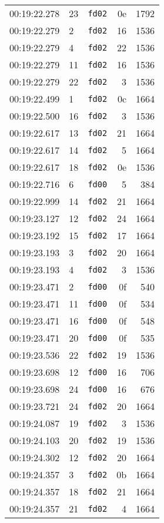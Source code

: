 \documentclass{article}
\begin{document}
\begin{longtable}{lllrr}
00:19:22.278 & 23 & \texttt{fd02} & 0e & 1792 \\
00:19:22.279 & 2 & \texttt{fd02} & 16 & 1536 \\
00:19:22.279 & 4 & \texttt{fd02} & 22 & 1536 \\
00:19:22.279 & 11 & \texttt{fd02} & 16 & 1536 \\
00:19:22.279 & 22 & \texttt{fd02} & 3 & 1536 \\
00:19:22.499 & 1 & \texttt{fd02} & 0c & 1664 \\
00:19:22.500 & 16 & \texttt{fd02} & 3 & 1536 \\
00:19:22.617 & 13 & \texttt{fd02} & 21 & 1664 \\
00:19:22.617 & 14 & \texttt{fd02} & 5 & 1664 \\
00:19:22.617 & 18 & \texttt{fd02} & 0e & 1536 \\
00:19:22.716 & 6 & \texttt{fd00} & 5 & 384 \\
00:19:22.999 & 14 & \texttt{fd02} & 21 & 1664 \\
00:19:23.127 & 12 & \texttt{fd02} & 24 & 1664 \\
00:19:23.192 & 15 & \texttt{fd02} & 17 & 1664 \\
00:19:23.193 & 3 & \texttt{fd02} & 20 & 1664 \\
00:19:23.193 & 4 & \texttt{fd02} & 3 & 1536 \\
00:19:23.471 & 2 & \texttt{fd00} & 0f & 540 \\
00:19:23.471 & 11 & \texttt{fd00} & 0f & 534 \\
00:19:23.471 & 16 & \texttt{fd00} & 0f & 548 \\
00:19:23.471 & 20 & \texttt{fd00} & 0f & 535 \\
00:19:23.536 & 22 & \texttt{fd02} & 19 & 1536 \\
00:19:23.698 & 12 & \texttt{fd00} & 16 & 706 \\
00:19:23.698 & 24 & \texttt{fd00} & 16 & 676 \\
00:19:23.721 & 24 & \texttt{fd02} & 20 & 1664 \\
00:19:24.087 & 19 & \texttt{fd02} & 3 & 1536 \\
00:19:24.103 & 20 & \texttt{fd02} & 19 & 1536 \\
00:19:24.302 & 12 & \texttt{fd02} & 20 & 1664 \\
00:19:24.357 & 3 & \texttt{fd02} & 0b & 1664 \\
00:19:24.357 & 18 & \texttt{fd02} & 21 & 1664 \\
00:19:24.357 & 21 & \texttt{fd02} & 4 & 1664 \\

\end{longtable}
\end{document}
